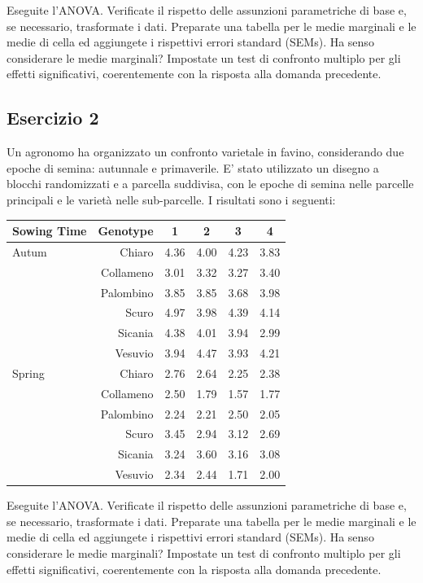 \documentclass[a4paper,12pt,oneside]{book}
\begin{document}
Eseguite l'ANOVA. Verificate il rispetto delle assunzioni parametriche di base e, se necessario, trasformate i dati. Preparate una tabella per le medie marginali e le medie di cella ed aggiungete i rispettivi errori standard (SEMs). Ha senso considerare le medie marginali? Impostate un test di confronto multiplo per gli effetti significativi, coerentemente con la risposta alla domanda precedente.

\hypertarget{esercizio-2-7}{%
\subsection{Esercizio 2}\label{esercizio-2-7}}

Un agronomo ha organizzato un confronto varietale in favino, considerando due epoche di semina: autunnale e primaverile. E' stato utilizzato un disegno a blocchi randomizzati e a parcella suddivisa, con le epoche di semina nelle parcelle principali e le varietà nelle sub-parcelle. I risultati sono i seguenti:

\begin{longtable}[]{@{}lrcccc@{}}
\toprule
Sowing Time & Genotype & 1 & 2 & 3 & 4 \\
\midrule
\endhead
Autum & Chiaro & 4.36 & 4.00 & 4.23 & 3.83 \\
& Collameno & 3.01 & 3.32 & 3.27 & 3.40 \\
& Palombino & 3.85 & 3.85 & 3.68 & 3.98 \\
& Scuro & 4.97 & 3.98 & 4.39 & 4.14 \\
& Sicania & 4.38 & 4.01 & 3.94 & 2.99 \\
& Vesuvio & 3.94 & 4.47 & 3.93 & 4.21 \\
Spring & Chiaro & 2.76 & 2.64 & 2.25 & 2.38 \\
& Collameno & 2.50 & 1.79 & 1.57 & 1.77 \\
& Palombino & 2.24 & 2.21 & 2.50 & 2.05 \\
& Scuro & 3.45 & 2.94 & 3.12 & 2.69 \\
& Sicania & 3.24 & 3.60 & 3.16 & 3.08 \\
& Vesuvio & 2.34 & 2.44 & 1.71 & 2.00 \\
\bottomrule
\end{longtable}

Eseguite l'ANOVA. Verificate il rispetto delle assunzioni parametriche di base e, se necessario, trasformate i dati. Preparate una tabella per le medie marginali e le medie di cella ed aggiungete i rispettivi errori standard (SEMs). Ha senso considerare le medie marginali? Impostate un test di confronto multiplo per gli effetti significativi, coerentemente con la risposta alla domanda precedente.
\end{document}
